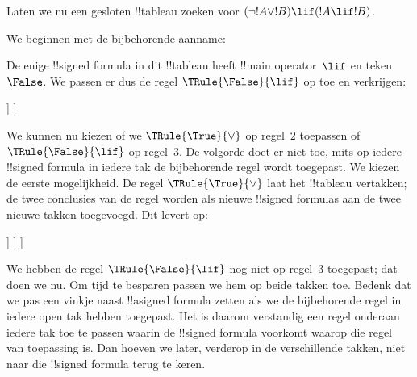 \documentclass[openany]{memoir}
\begin{document}
\begin{ex}
Laten we nu een gesloten !!{tableau} zoeken voor
$(\lnot !A \lor !B) \lif (!A \lif !B)$.

We beginnen met de bijbehorende aanname:
\begin{oltableau}
  [\sFmla{\False}{(\lnot \formula{A} \lor \formula{B}) \lif
      (\formula{A} \lif \formula{B})}, just=\TAss]
\end{oltableau}
De enige !!{signed formula} in dit !!{tableau} heeft
!!{main operator}~$\lif$ en teken~$\False$. We passen er dus de regel
$\TRule{\False}{\lif}$ op toe en verkrijgen:
\begin{oltableau}
  [\sFmla{\False}{(\lnot \formula{A} \lor \formula{B})
      \lif (\formula{A} \lif \formula{B})}, just=\TAss, checked
    [\sFmla{\True}{\lnot \formula{A} \lor \formula{B}},
      just={\TRule{\False}{\lif}[1]}
      [\sFmla{\False}{(\formula{A} \lif \formula{B})},
        just={\TRule{\False}{\lif}[1]}
      ]
    ]
  ]
\end{oltableau}
We kunnen nu kiezen of we $\TRule{\True}{\lor}$ op regel~$2$ toepassen
of $\TRule{\False}{\lif}$ op regel~$3$. De volgorde doet er niet toe,
mits op iedere !!{signed formula} in iedere tak de bijbehorende regel
wordt toegepast. We kiezen de eerste mogelijkheid. De regel
$\TRule{\True}{\lor}$ laat het !!{tableau} vertakken; de twee conclusies
van de regel worden als nieuwe !!{signed formula}s aan de twee nieuwe
takken toegevoegd. Dit levert op:
\begin{oltableau}
  [\sFmla{\False}{(\lnot \formula{A} \lor \formula{B}) \lif
      (\formula{A} \lif \formula{B})}, just=\TAss, checked
    [\sFmla{\True}{\lnot \formula{A} \lor \formula{B}},
      just={\TRule{\False}{\lif}[1]}, checked
      [\sFmla{\False}{(\formula{A} \lif \formula{B})},
        just={\TRule{\False}{\lif}[1]}
        [\sFmla{\True}{\lnot \formula{A}}, just={\TRule{\True}{\lor}[2]}]
        [\sFmla{\True}{\formula{B}}, just={\TRule{\True}{\lor}[2]}]
      ]
    ]
  ]
\end{oltableau}
We hebben de regel $\TRule{\False}{\lif}$ nog niet op regel~$3$
toegepast; dat doen we nu. Om tijd te besparen passen we hem op beide
takken toe. Bedenk dat we pas een vinkje naast !!a{signed formula}
zetten als we de bijbehorende regel in iedere open tak hebben toegepast.
Het is daarom verstandig een regel onderaan iedere tak toe te passen
waarin de !!{signed formula} voorkomt waarop die regel van toepassing
is. Dan hoeven we later, verderop in de verschillende takken, niet naar
die !!{signed formula} terug te keren.

\end{ex}
\end{document}
